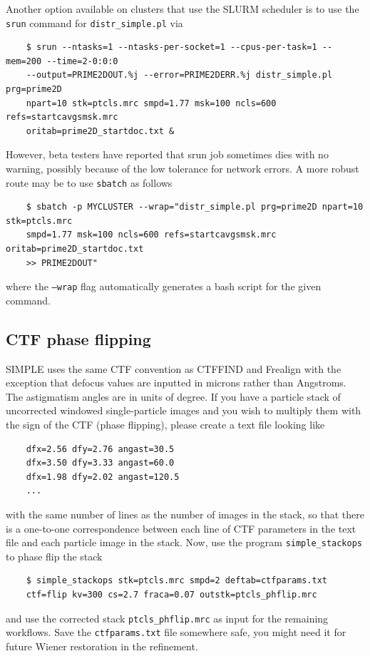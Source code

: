 \documentclass[a4paper,11pt]{article}
\newcommand{\prgname}[1]{\textcolor{NavyBlue}{\texttt{#1}}}
\begin{document}
Another option available on clusters that use the SLURM scheduler is to use the \texttt{srun} command for \prgname{distr\_simple.pl} via
\begin{verbatim}
    $ srun --ntasks=1 --ntasks-per-socket=1 --cpus-per-task=1 --mem=200 --time=2-0:0:0
    --output=PRIME2DOUT.%j --error=PRIME2DERR.%j distr_simple.pl prg=prime2D 
    npart=10 stk=ptcls.mrc smpd=1.77 msk=100 ncls=600 refs=startcavgsmsk.mrc 
    oritab=prime2D_startdoc.txt &
\end{verbatim}
However, beta testers have reported that srun job sometimes dies with no warning, possibly because of the low tolerance for network errors. A more robust route may be to use \texttt{sbatch} as follows
\begin{verbatim}
    $ sbatch -p MYCLUSTER --wrap="distr_simple.pl prg=prime2D npart=10 stk=ptcls.mrc
    smpd=1.77 msk=100 ncls=600 refs=startcavgsmsk.mrc oritab=prime2D_startdoc.txt 
    >> PRIME2DOUT"
\end{verbatim}
where the \texttt{--wrap} flag automatically generates a bash script for the given command.

\subsection{CTF phase flipping}
\label{ctfflip}
SIMPLE uses the same CTF convention as CTFFIND\citep{Mindell:2003aa} and Frealign\citep{Grigorieff:2007aa} with the exception that defocus values are inputted in microns rather than Angstroms. The astigmatism angles are in units of degree. If you have a particle stack of uncorrected windowed single-particle images and you wish to multiply them with the sign of the CTF (phase flipping), please create a text file looking like
\begin{verbatim}
    dfx=2.56 dfy=2.76 angast=30.5
    dfx=3.50 dfy=3.33 angast=60.0
    dfx=1.98 dfy=2.02 angast=120.5
    ...
\end{verbatim}
with the same number of lines as the number of images in the stack, so that there is a one-to-one correspondence between each line of CTF parameters in the text file and each particle image in the stack. Now, use the program \prgname{simple\_stackops} to phase flip the stack
\begin{verbatim}
    $ simple_stackops stk=ptcls.mrc smpd=2 deftab=ctfparams.txt 
    ctf=flip kv=300 cs=2.7 fraca=0.07 outstk=ptcls_phflip.mrc
\end{verbatim}
and use the corrected stack \texttt{ptcls\_phflip.mrc} as input for the remaining workflows. Save the \texttt{ctfparams.txt} file somewhere safe, you might need it for future Wiener restoration in the refinement.
\end{document}
